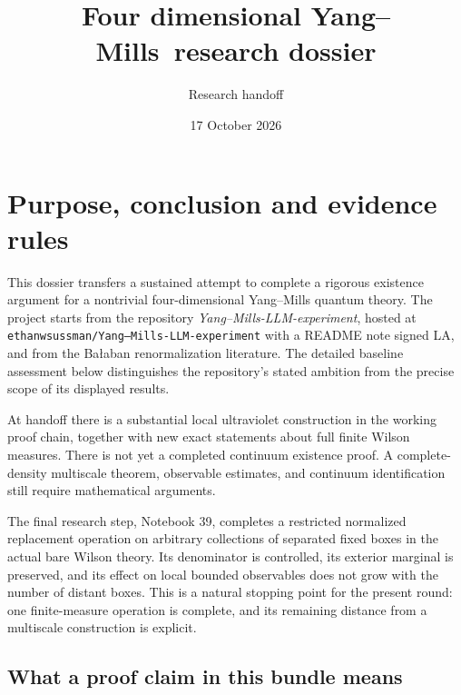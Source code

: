 \documentclass[11pt]{article}
\author{Research handoff}
\date{17 October 2026}
\title{Four dimensional Yang--Mills\ research dossier}
\theoremstyle{remark}
\begin{document}
\maketitle
\tableofcontents
\clearpage
\section{Purpose, conclusion and evidence rules}
\label{hdc-purpose}

This dossier transfers a sustained attempt to complete a rigorous
existence argument for a nontrivial four-dimensional Yang--Mills
quantum theory. The project starts from the repository
\emph{Yang--Mills-LLM-experiment}, hosted at
\texttt{ethanwsussman/Yang--Mills-LLM-experiment} with a README
note signed LA, and from the Ba{\l}aban renormalization literature. The detailed
baseline assessment below distinguishes the repository's stated
ambition from the precise scope of its displayed results.

At handoff there is a substantial local ultraviolet construction
in the working proof chain, together with new exact statements
about full finite Wilson measures. There is not yet a completed
continuum existence proof. A complete-density multiscale theorem,
observable estimates, and continuum identification still require
mathematical arguments.

The final research step, Notebook 39, completes a restricted
normalized replacement operation on arbitrary collections of
separated fixed boxes in the actual bare Wilson theory. Its
denominator is controlled, its exterior marginal is preserved,
and its effect on local bounded observables does not grow with
the number of distant boxes. This is a natural stopping point
for the present round: one finite-measure operation is complete,
and its remaining distance from a multiscale construction is explicit.

\subsection{What a proof claim in this bundle means}
\end{document}
